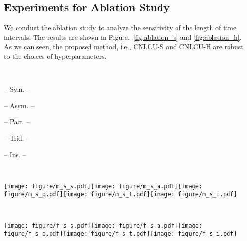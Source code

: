 \documentclass[11pt]{article}
\begin{document}
\subsection{Experiments for Ablation Study}
We conduct the ablation study to analyze the sensitivity of the length of time intervals. The results are shown in Figure.~\ref{fig:ablation_s} and \ref{fig:ablation_h}. As we can seen, the proposed method, i.e., CNLCU-S and CNLCU-H are robust to the choices of hyperparameters.


\begin{figure*}[!h]
    \centering
    \begin{minipage}[c]{0.05\columnwidth}~\end{minipage}\begin{minipage}[c]{0.187\textwidth}\centering\small -- \scriptsize{Sym.} -- \end{minipage}\begin{minipage}[c]{0.187\textwidth}\centering\small -- \scriptsize{Asym.} -- \end{minipage}\begin{minipage}[c]{0.187\textwidth}\centering\small -- \scriptsize{Pair.} -- \end{minipage}
    \begin{minipage}[c]{0.187\textwidth}\centering\small -- \scriptsize{Trid.} -- \end{minipage}
    \begin{minipage}[c]{0.187\textwidth}\centering\small -- \scriptsize{Ins.} -- \end{minipage}\\
    \begin{minipage}[c]{0.05\columnwidth}\centering\small {} \end{minipage}\begin{minipage}[c]{0.95\textwidth}
        \texttt{[image: figure/m\_s\_s.pdf]}\texttt{[image: figure/m\_s\_a.pdf]}\texttt{[image: figure/m\_s\_p.pdf]}\texttt{[image: figure/m\_s\_t.pdf]}\texttt{[image: figure/m\_s\_i.pdf]}\end{minipage}\\
    \vspace{5pt}
    \begin{minipage}[c]{0.05\columnwidth}\centering\small {} \end{minipage}\begin{minipage}[c]{0.95\textwidth}
        \texttt{[image: figure/f\_s\_s.pdf]}\texttt{[image: figure/f\_s\_a.pdf]}\texttt{[image: figure/f\_s\_p.pdf]}\texttt{[image: figure/f\_s\_t.pdf]}\texttt{[image: figure/f\_s\_i.pdf]}\end{minipage}\\
    \caption{Illustrations of the hyperparameter sensitivity for the proposed CNLCU-S. The error bar for standard deviation in each figure has been shaded.}
    \label{fig:ablation_s}
\end{figure*}
\end{document}
